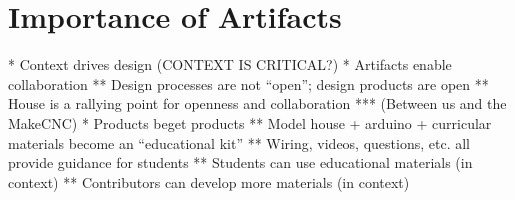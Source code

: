 \section{Importance of Artifacts}

* Context drives design (CONTEXT IS CRITICAL?)
* Artifacts enable collaboration
** Design processes are not ``open''; design products are open
** House is a rallying point for openness and collaboration
*** (Between us and the MakeCNC)
* Products beget products
** Model house + arduino + curricular materials become an ``educational kit''
** Wiring, videos, questions, etc. all provide guidance for students
** Students can use educational materials (in context)
** Contributors can develop more materials (in context)
